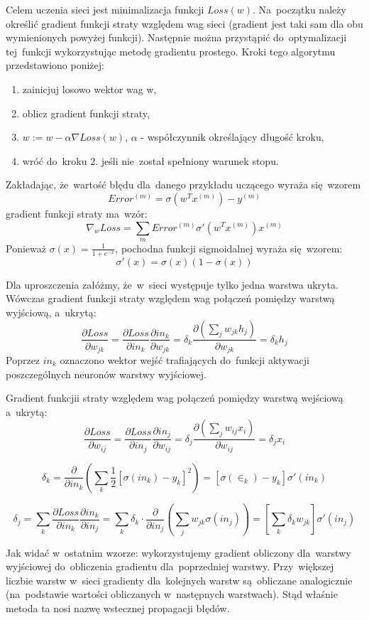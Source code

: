Celem uczenia sieci jest minimalizacja funkcji $Loss(w)$. Na~początku należy określić gradient funkcji straty
względem wag sieci (gradient jest taki sam dla obu wymienionych powyżej funkcji).
Następnie można przystąpić do~optymalizacji tej~funkcji wykorzystując metodę gradientu prostego.
Kroki tego algorytmu przedstawiono poniżej:
\begin{enumerate}
  \item zainicjuj losowo wektor wag w,
  \item oblicz gradient funkcji straty,
  \item $w:=w-\alpha \nabla Loss(w)$, $\alpha$ - współczynnik określający długość kroku,
  \item wróć do~kroku 2. jeśli nie~został spełniony warunek stopu.
\end{enumerate}

Zakładając, że~wartość błędu dla~danego przykładu uczącego wyraża się~wzorem
$$Error^{(m)}=\sigma(w^{T}x^{(m)})-y^{(m)}$$
gradient funkcji straty ma~wzór:
$$\nabla_{w}Loss=\sum\limits_{m}Error^{(m)}\sigma'(w^{T}x^{(m)})x^{(m)}$$
Ponieważ $\sigma(x)=\frac{1}{1+e^{-x}}$, pochodna funkcji sigmoidalnej wyraża się~wzorem:
$$\sigma'(x)=\sigma(x)(1-\sigma(x))$$

Dla uproszczenia załóżmy, że~w~sieci występuje tylko jedna warstwa ukryta. Wówczas gradient funkcji straty
względem wag połączeń pomiędzy warstwą wyjściową, a~ukrytą:
$$\frac{\partial Loss}{\partial w_{jk}}=\frac{\partial Loss}{\partial in_k}\frac{\partial
in_k}{\partial w_{jk}}= \delta_k \frac{\partial (\sum\limits_j w_{jk}h_j)}{\partial w_{jk}} = \delta_k h_j$$
Poprzez $in_k$ oznaczono wektor wejść trafiających do~funkcji aktywacji poszczególnych neuronów warstwy
wyjściowej.

Gradient funkcjii straty względem wag połączeń pomiędzy warstwą wejściową a~ukrytą:
$$ \frac{\partial Loss}{\partial w_{ij}}=\frac{\partial Loss}{\partial in_j}\frac{\partial in_j}{\partial
w_{ij}} = \delta_j \frac{\partial (\sum\limits_j w_{ij}x_i)}{\partial w_{ij}} = \delta_j x_i $$

$$ \delta_k = \frac{\partial}{\partial in_k}(\sum\limits_k \frac{1}{2}
[\sigma(in_k)-y_k]^2)=[\sigma(\in_k)-y_k]\sigma'(in_k)$$

$$ \delta_j = \sum\limits_k\frac{\partial Loss}{\partial in_k}\frac{\partial in_k}{\partial
in_j}=\sum\limits_k \delta_k \cdot \frac{\partial}{\partial in_j}(\sum\limits_j w_{jk}\sigma(in_j))=[\sum\limits_k \delta_k
w_{jk}]\sigma'(in_j)$$

Jak widać w~ostatnim wzorze: wykorzystujemy gradient obliczony dla~warstwy wyjściowej
do~obliczenia gradientu dla~poprzedniej warstwy. Przy~większej liczbie warstw w~sieci gradienty
dla~kolejnych warstw są~obliczane analogicznie (na~podstawie wartości obliczanych w~następnych warstwach).
Stąd właśnie metoda ta nosi nazwę wstecznej propagacji błędów.



